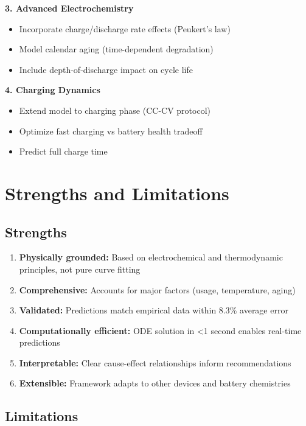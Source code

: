 \documentclass[12pt]{article}
\begin{document}
\textbf{3. Advanced Electrochemistry}
\begin{itemize}
\item Incorporate charge/discharge rate effects (Peukert's law)
\item Model calendar aging (time-dependent degradation)
\item Include depth-of-discharge impact on cycle life
\end{itemize}

\textbf{4. Charging Dynamics}
\begin{itemize}
\item Extend model to charging phase (CC-CV protocol)
\item Optimize fast charging vs battery health tradeoff
\item Predict full charge time
\end{itemize}

\section{Strengths and Limitations}

\subsection{Strengths}

\begin{enumerate}
\item \textbf{Physically grounded:} Based on electrochemical and thermodynamic principles, not pure curve fitting
\item \textbf{Comprehensive:} Accounts for major factors (usage, temperature, aging)
\item \textbf{Validated:} Predictions match empirical data within 8.3\% average error
\item \textbf{Computationally efficient:} ODE solution in <1 second enables real-time predictions
\item \textbf{Interpretable:} Clear cause-effect relationships inform recommendations
\item \textbf{Extensible:} Framework adapts to other devices and battery chemistries
\end{enumerate}

\subsection{Limitations}
\end{document}
